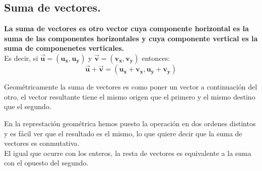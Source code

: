\documentclass[a4paper,11pt,answers]{exam}
\begin{document}
\subsection{Suma de vectores.}
\textbf{La suma de vectores es otro vector cuya componente horizontal es la suma de las componentes horizontales y cuya componente vertical es la suma de componenetes verticales.}\\
Es decir, si $\boldsymbol{\vec{u} = (u_x, u_y)}$ y $\boldsymbol{\vec{v} = (v_x, v_y)}$ entonces:
\[\boldsymbol{\vec{u} + \vec{v} = (u_x + v_x, u_y + v_y)}\]

Geométricamente la suma de vectores es como poner un vector a continuación del otro, el vector
resultante tiene el mismo origen que el primero y el mismo destino que el segundo.
\begin{center}
  \begin{multicols}{2}
    
  \end{multicols}
\end{center}

En la represtación geométrica hemos puesto la operación en dos ordenes distintos y es fácil ver
que el resultado es el mismo, lo que quiere decir que la suma de vectores es conmutativa.\\

El igual que ocurre con los enteros, la resta de vectores es equivalente a la suma con el
opuesto del segundo.
\end{document}
